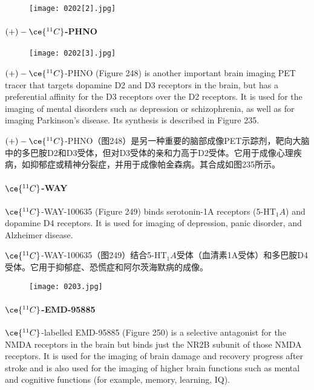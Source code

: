 \documentclass[dvipsnames, svgnames,a4paper,11pt]{article}
\begin{document}
\begin{figure}[h]
	\centering
    \texttt{[image: 0202[2].jpg]}  
     \label{fig247}
\end{figure}


\paragraph{\((+)-\ce{^{11}C}\)-PHNO}  

\begin{wrapfigure}{r}{0.4\textwidth}
    \centering
    \texttt{[image: 0202[3].jpg]}
     \label{fig248}

\end{wrapfigure}

\((+)-\ce{^{11}C}\)-PHNO (Figure 248) is another important brain imaging PET tracer that targets dopamine D2 and D3 receptors in the brain, but has a preferential affinity for the D3 receptors over the D2 receptors. It is used for the imaging of mental disorders such as depression or schizophrenia, as well as for imaging Parkinson's disease. Its synthesis is described in Figure 235.

\((+)-\ce{^{11}C}\)-PHNO（图248）是另一种重要的脑部成像PET示踪剂，靶向大脑中的多巴胺D2和D3受体，但对D3受体的亲和力高于D2受体。它用于成像心理疾病，如抑郁症或精神分裂症，并用于成像帕金森病。其合成如图235所示。

\paragraph{\(\ce{^{11}C}\)-WAY}  
\(\ce{^{11}C}\)-WAY-100635 (Figure 249) binds serotonin-1A receptors (5-HT\(_1A\)) and dopamine D4 receptors. It is used for imaging of depression, panic disorder, and Alzheimer disease.

\(\ce{^{11}C}\)-WAY-100635（图249）结合5-HT\(_1A\)受体（血清素1A受体）和多巴胺D4受体。它用于抑郁症、恐慌症和阿尔茨海默病的成像。

\begin{figure}[h]
	\centering
    \texttt{[image: 0203.jpg]}  
     \label{fig249}
\end{figure}

\paragraph{\(\ce{^{11}C}\)-EMD-95885}  
\(\ce{^{11}C}\)-labelled EMD-95885 (Figure 250) is a selective antagonist for the NMDA receptors in the brain but binds just the NR2B subunit of those NMDA receptors. It is used for the imaging of brain damage and recovery progress after stroke and is also used for the imaging of higher brain functions such as mental and cognitive functions (for example, memory, learning, IQ).
\end{document}
